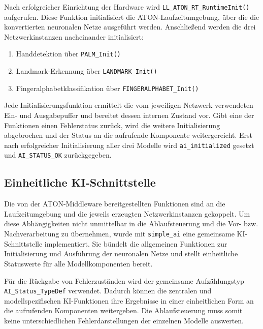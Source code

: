 Nach erfolgreicher Einrichtung der Hardware wird \texttt{LL\_ATON\_RT\_RuntimeInit()} aufgerufen. Diese Funktion initialisiert die ATON-Laufzeitumgebung, über die die konvertierten neuronalen Netze ausgeführt werden. Anschließend werden die drei Netzwerkinstanzen nacheinander initialisiert:

\begin{enumerate}
    \item Handdetektion über \texttt{PALM\_Init()}
    \item Landmark-Erkennung über \texttt{LANDMARK\_Init()}
    \item Fingeralphabetklassifikation über \texttt{FINGERALPHABET\_Init()}
\end{enumerate}

Jede Initialisierungsfunktion ermittelt die vom jeweiligen Netzwerk verwendeten Ein- und Ausgabepuffer und bereitet dessen internen Zustand vor. Gibt eine der Funktionen einen Fehlerstatus zurück, wird die weitere Initialisierung abgebrochen und der Status an die aufrufende Komponente weitergereicht. Erst nach erfolgreicher Initialisierung aller drei Modelle wird \texttt{ai\_initialized} gesetzt und \texttt{AI\_STATUS\_OK} zurückgegeben.

\subsection{Einheitliche KI-Schnittstelle}\label{sub:ki-schnittstelle}

Die von der ATON-Middleware bereitgestellten Funktionen sind an die Laufzeitumgebung und die jeweils erzeugten Netzwerkinstanzen gekoppelt. Um diese Abhängigkeiten nicht unmittelbar in die Ablaufsteuerung und die Vor- bzw. Nachverarbeitung zu übernehmen, wurde mit \texttt{simple\_ai} eine gemeinsame KI-Schnittstelle implementiert. Sie bündelt die allgemeinen Funktionen zur Initialisierung und Ausführung der neuronalen Netze und stellt einheitliche Statuswerte für alle Modellkomponenten bereit.

Für die Rückgabe von Fehlerzuständen wird der gemeinsame Aufzählungstyp \texttt{AI\_Status\_\allowbreak TypeDef} verwendet. Dadurch können die zentralen und modellspezifischen KI-Funktionen ihre Ergebnisse in einer einheitlichen Form an die aufrufenden Komponenten weitergeben. Die Ablaufsteuerung muss somit keine unterschiedlichen Fehlerdarstellungen der einzelnen Modelle auswerten.

